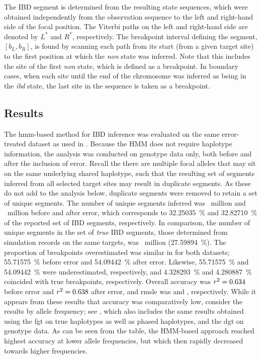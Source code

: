 The IBD segment is determined from the  resulting state sequences, which were obtained independently from the observation sequence to the left and right-hand side of the focal position.
The Viterbi paths on the left and right-hand side are denoted by $L^\ast$ and $R^\ast$, respectively.
The breakpoint interval defining the segment, ${[b_L, b_R]}$, is found by scanning each path from its start (\ie from a given target site) to the first position at which the \emph{non} state was inferred.
Note that this includes the site of the first \emph{non} state, which is defined as a breakpoint.
In boundary cases, when each site until the end of the chromosome was inferred as being in the \emph{ibd} state, the last site in the sequence is taken as a breakpoint.





%
\subsection{Results}
%

%

%

The \gls{hmm}-based method for IBD inference was evaluated on the same error-treated dataset as used in .
Because the HMM does not require haplotype information, the analysis was conducted on genotype data only, both before and after the inclusion of error.
Recall the there are multiple focal alleles that may sit on the same underlying shared haplotype, such that the resulting set of segments inferred from all selected target sites may result in duplicate segments.
As these do not add to the analysis below, duplicate segments were removed to retain a set of unique segments.
The number of unique segments inferred was
~million and ~million before and after error, which corresponds to \SI{32.25035}{\percent} and \SI{32.82710}{\percent} of the reported set of IBD segments, respectively.
In comparison, the number of unique segments in the set of \emph{true} IBD segments, those determined from simulation records on the same targets, was ~million (\SI{27.59894}{\percent}).
The proportion of breakpoints overestimated was similar in for both datasets; \SI{55.71575}{\percent} before error and \SI{54.09442}{\percent} after error.
Likewise, \SI{55.71575}{\percent} and \SI{54.09442}{\percent} were underestimated, respectively, and \SI{4.328293}{\percent} and \SI{4.280887}{\percent} coincided with true breakpoints, respectively.
Overall accuracy was ${r^2=\dec{0.6340087}}$ before error and ${r^2=\dec{0.6381827}}$ after error, and \gls{rmsle} was  and , respectively.
While it appears from these results that accuracy was comparatively low, consider the results by allele frequency; see , which also includes the same results obtained using the \gls{fgt} on true haplotypes as well as phased haplotypes, and the \gls{dgt} on genotype data.
As can be seen from the table, the HMM-based approach reached highest accuracy at lower allele frequencies, but which then rapidly decreased towards higher frequencies.

